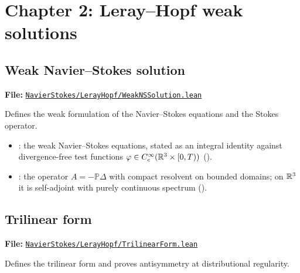 \section{Chapter 2: Leray--Hopf weak solutions}\label{sec:lean-ch2}

\subsection{Weak Navier--Stokes solution}\label{sec:lean-ch2-weak}

\textbf{File:}
\href{https://github.com/alejandro-soto-franco/navier-stokes/blob/master/lean/NavierStokes/LerayHopf/WeakNSSolution.lean}%
{\texttt{NavierStokes/LerayHopf/WeakNSSolution.lean}}

\medskip\noindent
Defines the weak formulation of the Navier--Stokes equations and the Stokes
operator.

\begin{itemize}
  \item {}: the weak Navier--Stokes
    equations, stated as an integral identity against divergence-free test
    functions $\varphi \in C^{\infty}_{c}(\mathbb{R}^{3} \times [0,T))$
    ().
  \item {}: the operator $A =
    -\mathbb{P}\Delta$ with compact resolvent on bounded domains; on $\mathbb{R}^{3}$
    it is self-adjoint with purely continuous spectrum
    ().
\end{itemize}

\subsection{Trilinear form}\label{sec:lean-ch2-trilinear}

\textbf{File:}
\href{https://github.com/alejandro-soto-franco/navier-stokes/blob/master/lean/NavierStokes/LerayHopf/TrilinearForm.lean}%
{\texttt{NavierStokes/LerayHopf/TrilinearForm.lean}}

\medskip\noindent
Defines the trilinear form and proves antisymmetry at distributional regularity.

